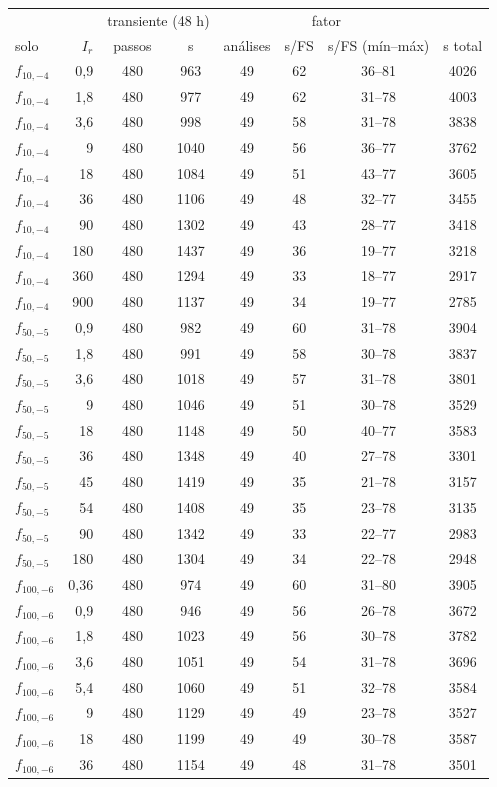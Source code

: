 \begin{tabular}{lr|cc|ccc|c}
\toprule
 & & \multicolumn{2}{c|}{transiente (48 h)} & \multicolumn{3}{c|}{fator} & \\
solo & $I_r$ & passos & s & análises & s/FS & s/FS (mín--máx) & s total\\
\midrule
$f_{10,-4}$ & 0{,}9 & 480 & 963 & 49 & 62 & 36--81 & 4026\\
$f_{10,-4}$ & 1{,}8 & 480 & 977 & 49 & 62 & 31--78 & 4003\\
$f_{10,-4}$ & 3{,}6 & 480 & 998 & 49 & 58 & 31--78 & 3838\\
$f_{10,-4}$ & 9 & 480 & 1040 & 49 & 56 & 36--77 & 3762\\
$f_{10,-4}$ & 18 & 480 & 1084 & 49 & 51 & 43--77 & 3605\\
$f_{10,-4}$ & 36 & 480 & 1106 & 49 & 48 & 32--77 & 3455\\
$f_{10,-4}$ & 90 & 480 & 1302 & 49 & 43 & 28--77 & 3418\\
$f_{10,-4}$ & 180 & 480 & 1437 & 49 & 36 & 19--77 & 3218\\
$f_{10,-4}$ & 360 & 480 & 1294 & 49 & 33 & 18--77 & 2917\\
$f_{10,-4}$ & 900 & 480 & 1137 & 49 & 34 & 19--77 & 2785\\
$f_{50,-5}$ & 0{,}9 & 480 & 982 & 49 & 60 & 31--78 & 3904\\
$f_{50,-5}$ & 1{,}8 & 480 & 991 & 49 & 58 & 30--78 & 3837\\
$f_{50,-5}$ & 3{,}6 & 480 & 1018 & 49 & 57 & 31--78 & 3801\\
$f_{50,-5}$ & 9 & 480 & 1046 & 49 & 51 & 30--78 & 3529\\
$f_{50,-5}$ & 18 & 480 & 1148 & 49 & 50 & 40--77 & 3583\\
$f_{50,-5}$ & 36 & 480 & 1348 & 49 & 40 & 27--78 & 3301\\
$f_{50,-5}$ & 45 & 480 & 1419 & 49 & 35 & 21--78 & 3157\\
$f_{50,-5}$ & 54 & 480 & 1408 & 49 & 35 & 23--78 & 3135\\
$f_{50,-5}$ & 90 & 480 & 1342 & 49 & 33 & 22--77 & 2983\\
$f_{50,-5}$ & 180 & 480 & 1304 & 49 & 34 & 22--78 & 2948\\
$f_{100,-6}$ & 0{,}36 & 480 & 974 & 49 & 60 & 31--80 & 3905\\
$f_{100,-6}$ & 0{,}9 & 480 & 946 & 49 & 56 & 26--78 & 3672\\
$f_{100,-6}$ & 1{,}8 & 480 & 1023 & 49 & 56 & 30--78 & 3782\\
$f_{100,-6}$ & 3{,}6 & 480 & 1051 & 49 & 54 & 31--78 & 3696\\
$f_{100,-6}$ & 5{,}4 & 480 & 1060 & 49 & 51 & 32--78 & 3584\\
$f_{100,-6}$ & 9 & 480 & 1129 & 49 & 49 & 23--78 & 3527\\
$f_{100,-6}$ & 18 & 480 & 1199 & 49 & 49 & 30--78 & 3587\\
$f_{100,-6}$ & 36 & 480 & 1154 & 49 & 48 & 31--78 & 3501\\
\bottomrule
\end{tabular}
